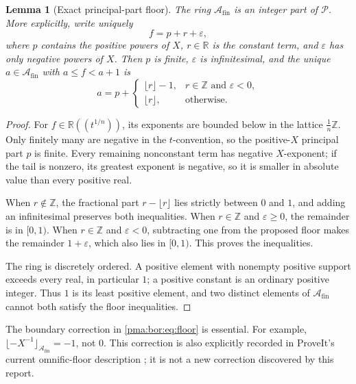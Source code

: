 \documentclass[11pt]{article}
\numberwithin{equation}{section}
\newtheorem{lemma}[lemma]{Lemma}
\theoremstyle{definition}
\theoremstyle{remark}
\newcommand{\Z}{\mathbb Z}
\newcommand{\R}{\mathbb R}
\newcommand{\Pui}{\mathcal P}
\newcommand{\A}{\mathcal A_{\mathrm{fin}}}
\begin{document}
\begin{lemma}[Exact principal-part floor]
\label{pma:bor:lem:floor}
The ring $\A$ is an integer part of $\Pui$. More explicitly, write uniquely
\[
 f=p+r+\varepsilon,
\]
where $p$ contains the positive powers of $X$, $r\in\R$ is the constant
term, and $\varepsilon$ has only negative powers of $X$. Then $p$ is finite,
$\varepsilon$ is infinitesimal, and the unique $a\in\A$ with
$a\leq f<a+1$ is
\begin{equation}
\label{pma:bor:eq:floor}
 a=p+\begin{cases}
 \lfloor r\rfloor-1,&r\in\Z\text{ and }\varepsilon<0,\\
 \lfloor r\rfloor,&\text{otherwise}.
 \end{cases}
\end{equation}
\end{lemma}
\begin{proof}
For $f\in\R((t^{1/n}))$, its exponents are bounded below in the lattice
$\frac1n\Z$. Only finitely many are negative in the $t$-convention, so the
positive-$X$ principal part $p$ is finite. Every remaining nonconstant term
has negative $X$-exponent; if the tail is nonzero, its greatest exponent is
negative, so it is smaller in absolute value than every positive real.

When $r\notin\Z$, the fractional part $r-\lfloor r\rfloor$ lies strictly
between $0$ and $1$, and adding an infinitesimal preserves both inequalities.
When $r\in\Z$ and $\varepsilon\geq0$, the remainder is in $[0,1)$.
When $r\in\Z$ and $\varepsilon<0$, subtracting one from the proposed floor
makes the remainder $1+\varepsilon$, which also lies in $[0,1)$.
This proves the inequalities.

The ring is discretely ordered. A positive element with nonempty positive
support exceeds every real, in particular $1$; a positive constant is an
ordinary positive integer. Thus $1$ is its least positive element, and two
distinct elements of $\A$ cannot both satisfy the floor inequalities.
\end{proof}

The boundary correction in \eqref{pma:bor:eq:floor} is essential. For example,
$\lfloor-X^{-1}\rfloor_{\A}=-1$, not $0$. This correction is also explicitly
recorded in ProveIt's current omnific-floor description \cite{RepoMain}; it is
not a new correction discovered by this report.
\end{document}

